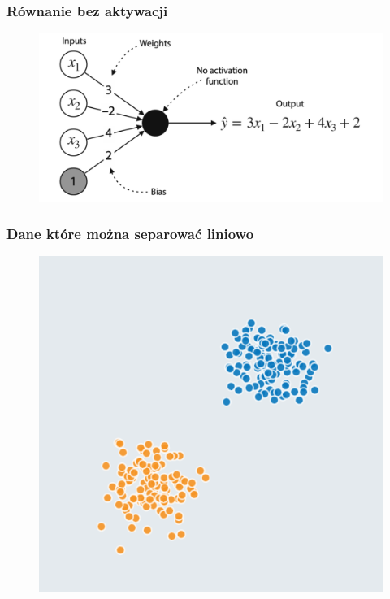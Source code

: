 \documentclass[smaller]{beamer}
\begin{document}

\begin{frame}
\frametitle{Równanie bez aktywacji}
\begin{figure}
    \centering
    \includegraphics[width=\textwidth,height=0.7\textheight,keepaspectratio]{../manifest/no-activation.png}
\end{figure}
\end{frame}


\begin{frame}
\frametitle{Dane które można separować liniowo}
\begin{figure}
    \centering
    \includegraphics[width=\textwidth,height=0.7\textheight,keepaspectratio]{../manifest/linear-data.png}
\end{figure}
\end{frame}
\end{document}
